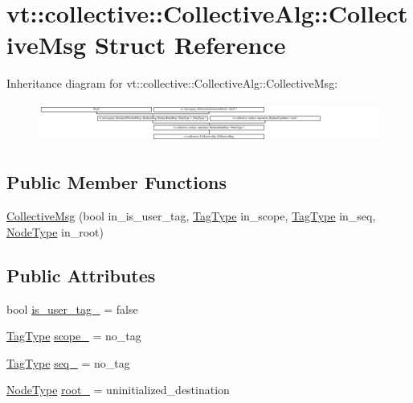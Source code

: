\hypertarget{structvt_1_1collective_1_1_collective_alg_1_1_collective_msg}{}\section{vt\+:\+:collective\+:\+:Collective\+Alg\+:\+:Collective\+Msg Struct Reference}
\label{structvt_1_1collective_1_1_collective_alg_1_1_collective_msg}
Inheritance diagram for vt\+:\+:collective\+:\+:Collective\+Alg\+:\+:Collective\+Msg\+:\begin{figure}[H]
\begin{center}
\leavevmode
\includegraphics[height=1.335719cm]{structvt_1_1collective_1_1_collective_alg_1_1_collective_msg}
\end{center}
\end{figure}
\subsection*{Public Member Functions}
\begin{DoxyCompactItemize}
\item 
\hyperlink{structvt_1_1collective_1_1_collective_alg_1_1_collective_msg_aaada3dc8f56f22a51f0acafadc0f7da1}{Collective\+Msg} (bool in\+\_\+is\+\_\+user\+\_\+tag, \hyperlink{namespacevt_a84ab281dae04a52a4b243d6bf62d0e52}{Tag\+Type} in\+\_\+scope, \hyperlink{namespacevt_a84ab281dae04a52a4b243d6bf62d0e52}{Tag\+Type} in\+\_\+seq, \hyperlink{namespacevt_a866da9d0efc19c0a1ce79e9e492f47e2}{Node\+Type} in\+\_\+root)
\end{DoxyCompactItemize}
\subsection*{Public Attributes}
\begin{DoxyCompactItemize}
\item 
bool \hyperlink{structvt_1_1collective_1_1_collective_alg_1_1_collective_msg_abbea1ecbb8f581de22a00212c54c510b}{is\+\_\+user\+\_\+tag\+\_\+} = false
\item 
\hyperlink{namespacevt_a84ab281dae04a52a4b243d6bf62d0e52}{Tag\+Type} \hyperlink{structvt_1_1collective_1_1_collective_alg_1_1_collective_msg_a1199e6f4082c080b6e216b6799b8c901}{scope\+\_\+} = no\+\_\+tag
\item 
\hyperlink{namespacevt_a84ab281dae04a52a4b243d6bf62d0e52}{Tag\+Type} \hyperlink{structvt_1_1collective_1_1_collective_alg_1_1_collective_msg_ad0d769a13cfd2a0fe18b10b75a3d1d29}{seq\+\_\+} = no\+\_\+tag
\item 
\hyperlink{namespacevt_a866da9d0efc19c0a1ce79e9e492f47e2}{Node\+Type} \hyperlink{structvt_1_1collective_1_1_collective_alg_1_1_collective_msg_a03018b66962b29349783e4f93129df0f}{root\+\_\+} = uninitialized\+\_\+destination
\end{DoxyCompactItemize}
